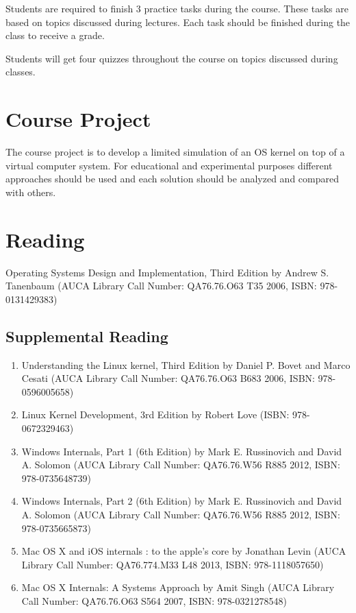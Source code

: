 \documentclass[12pt,a4paper,oneside]{article}
\begin{document}
        Students are required to finish 3 practice tasks during the course.
        These tasks are based on topics discussed during lectures. Each task
        should be finished during the class to receive a grade.

        Students will get four quizzes throughout the course on topics discussed
        during classes.

    \section{Course Project}

        The course project is to develop a limited simulation of an OS kernel on
        top of a virtual computer system. For educational and experimental
        purposes different approaches should be used and each solution should be
        analyzed and compared with others.

    \section{Reading}

        Operating Systems Design and Implementation, Third Edition by Andrew S.
        Tanenbaum (AUCA Library Call Number: QA76.76.O63 T35 2006, ISBN:
        978-0131429383)

        \subsection{Supplemental Reading}
            \begin{enumerate}
                \item Understanding the Linux kernel, Third Edition by Daniel P.
                Bovet and Marco Cesati (AUCA Library Call Number: QA76.76.O63
                B683 2006, ISBN: 978-0596005658)
                \item Linux Kernel Development, 3rd Edition by Robert Love
                (ISBN: 978-0672329463)
                \item Windows Internals, Part 1 (6th Edition) by Mark E.
                Russinovich and David A. Solomon (AUCA Library Call Number:
                QA76.76.W56 R885 2012, ISBN: 978-0735648739)
                \item Windows Internals, Part 2 (6th Edition) by Mark E.
                Russinovich and David A. Solomon (AUCA Library Call Number:
                QA76.76.W56 R885 2012, ISBN: 978-0735665873)
                \item Mac OS X and iOS internals : to the apple's core by
                Jonathan Levin (AUCA Library Call Number: QA76.774.M33 L48 2013,
                ISBN: 978-1118057650)
                \item Mac OS X Internals: A Systems Approach by Amit Singh (AUCA
                Library Call Number: QA76.76.O63 S564 2007, ISBN:
                978-0321278548)
            \end{enumerate}
\end{document}
